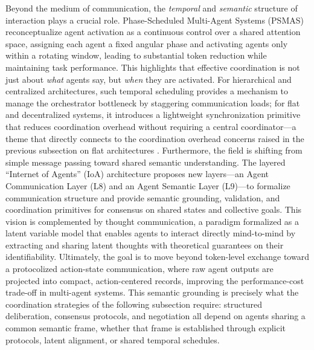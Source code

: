 \documentclass[11pt]{article}
\begin{document}
Beyond the medium of communication, the \emph{temporal} and \emph{semantic} structure of interaction plays a crucial role. Phase-Scheduled Multi-Agent Systems (PSMAS) reconceptualize agent activation as a continuous control over a shared attention space, assigning each agent a fixed angular phase and activating agents only within a rotating window, leading to substantial token reduction while maintaining task performance. \cite{ref75} This highlights that effective coordination is not just about \emph{what} agents say, but \emph{when} they are activated. For hierarchical and centralized architectures, such temporal scheduling provides a mechanism to manage the orchestrator bottleneck by staggering communication loads; for flat and decentralized systems, it introduces a lightweight synchronization primitive that reduces coordination overhead without requiring a central coordinator---a theme that directly connects to the coordination overhead concerns raised in the previous subsection on flat architectures \cite{ref28}. Furthermore, the field is shifting from simple message passing toward shared semantic understanding. The layered ``Internet of Agents'' (IoA) architecture proposes new layers---an Agent Communication Layer (L8) and an Agent Semantic Layer (L9)---to formalize communication structure and provide semantic grounding, validation, and coordination primitives for consensus on shared states and collective goals. \cite{ref76} This vision is complemented by thought communication, a paradigm formalized as a latent variable model that enables agents to interact directly mind-to-mind by extracting and sharing latent thoughts with theoretical guarantees on their identifiability. \cite{ref77} Ultimately, the goal is to move beyond token-level exchange toward a protocolized action-state communication, where raw agent outputs are projected into compact, action-centered records, improving the performance-cost trade-off in multi-agent systems. \cite{ref78} This semantic grounding is precisely what the coordination strategies of the following subsection require: structured deliberation, consensus protocols, and negotiation all depend on agents sharing a common semantic frame, whether that frame is established through explicit protocols, latent alignment, or shared temporal schedules.
\end{document}
